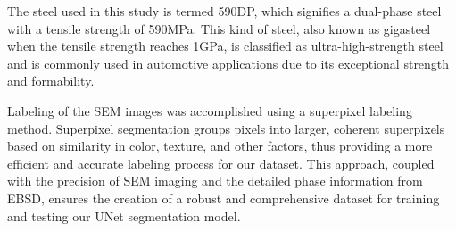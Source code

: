 \documentclass[]{article}
\begin{document}
The steel used in this study is termed 590DP, which signifies a dual-phase steel with a tensile strength of 590MPa. This kind of steel, also known as gigasteel when the tensile strength reaches 1GPa, is classified as ultra-high-strength steel and is commonly used in automotive applications due to its exceptional strength and formability.

Labeling of the SEM images was accomplished using a superpixel labeling method. Superpixel segmentation groups pixels into larger, coherent superpixels based on similarity in color, texture, and other factors, thus providing a more efficient and accurate labeling process for our dataset. This approach, coupled with the precision of SEM imaging and the detailed phase information from EBSD, ensures the creation of a robust and comprehensive dataset for training and testing our UNet segmentation model.
\end{document}
